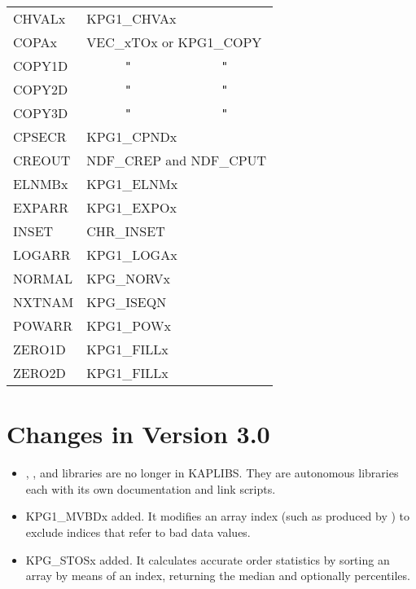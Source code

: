 \begin{itemize}
\begin{tabular}{lcc}
CHVALx  & \multicolumn{2}{l}{KPG1\_CHVAx} \\
COPAx   & \multicolumn{2}{l}{VEC\_xTOx or KPG1\_COPY} \\
COPY1D  & {\tt "}   & {\tt "}  \\
COPY2D  & {\tt "}   & {\tt "}  \\
COPY3D  & {\tt "}   & {\tt "}  \\
CPSECR  & \multicolumn{2}{l}{KPG1\_CPNDx} \\
CREOUT  & \multicolumn{2}{l}{NDF\_CREP and NDF\_CPUT} \\
ELNMBx  & \multicolumn{2}{l}{KPG1\_ELNMx} \\
EXPARR  & \multicolumn{2}{l}{KPG1\_EXPOx} \\
INSET   & \multicolumn{2}{l}{CHR\_INSET} \\
LOGARR  & \multicolumn{2}{l}{KPG1\_LOGAx} \\
NORMAL  & \multicolumn{2}{l}{KPG\_NORVx} \\
NXTNAM  & \multicolumn{2}{l}{KPG\_ISEQN} \\
POWARR  & \multicolumn{2}{l}{KPG1\_POWx} \\
ZERO1D  & \multicolumn{2}{l}{KPG1\_FILLx} \\
ZERO2D  & \multicolumn{2}{l}{KPG1\_FILLx}
\end{tabular}
\end{itemize}

\section{Changes in Version 3.0}
\begin{itemize}
\item {}, , and 
      libraries are no longer in KAPLIBS.  They are autonomous
      libraries each with its own documentation and link scripts.
\item KPG1\_MVBDx added. It modifies an array index (such as produced by
      ) to exclude indices that refer
      to bad data values.
\item KPG\_STOSx added.  It calculates accurate order statistics by
      sorting an array by means of an index, returning the median and
      optionally percentiles.
\end{itemize}

